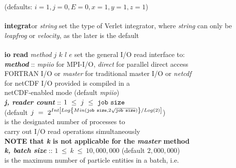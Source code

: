 \begin{tabbing}
\>                                              \> (defaults: $i = 1, j = 0, E = 0, x = 1, y = 1, z = 1$) \\
\>                                              \> \\
\> {\bf integrat}or {\em string}                \> set the type of Verlet integrator, where {\em string} can only be \\
\>                                              \> {\em leapfrog} or {\em velocity}, as the later is the default \\
\>                                              \> \\
\> {\bf io read} {\em method}  $j$ $k$ $l$ $e$  \> set the general I/O read interface to: \\
\>                                              \> {\bf \em method} :: {\em mpiio} for MPI-I/O, {\em direct} for parallel direct access \\
\>                                              \> \phantom{x} FORTRAN I/O or {\em master} for traditional master I/O or {\em netcdf} \\
\>                                              \> \phantom{x} for netCDF I/O provided \D is compiled in a \\
\>                                              \> \phantom{x} netCDF-enabled mode (default {\em mpiio}) \\
\>                                              \> \phantom{xxx} {\bf \em j, reader count} :: $1~\le~j~\le~{\tt job~size}$ \\
\>                                              \> \phantom{xxxx} (default $j~=~2^{Int\left[Log\left\{Min({\tt job~size},2\sqrt{\tt job~size})\right\}/Log(2)\right]}$) \\
\>                                              \> \phantom{xxxx} is the designated number of processes to \\
\>                                              \> \phantom{xxxx} carry out I/O read operations simultaneously \\
\>                                              \> {\bf NOTE that {\em k} is not applicable for the {\em master} method} \\
\>                                              \> \phantom{xxx} {\bf \em k, batch size} :: $1~\le~k~\le~10,000,000$ (default $2,000,000$) \\
\>                                              \> \phantom{xxxx} is the maximum number of particle entities in a batch, i.e. \\

\end{tabbing}
